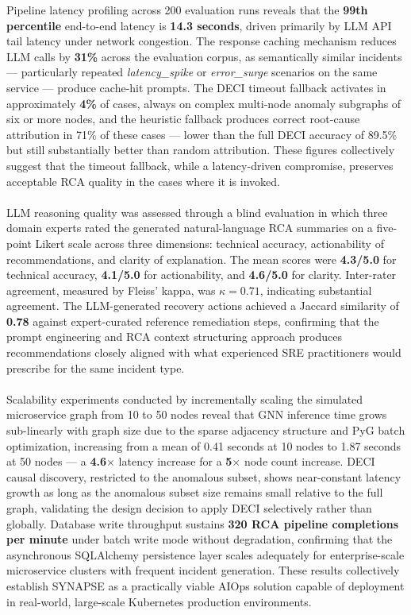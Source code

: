 \hspace*{0.3in} Pipeline latency profiling across 200 evaluation runs reveals that the \textbf{99th percentile} end-to-end latency is \textbf{14.3 seconds}, driven primarily by LLM API tail latency under network congestion. The response caching mechanism reduces LLM calls by \textbf{31\%} across the evaluation corpus, as semantically similar incidents — particularly repeated \textit{latency\_spike} or \textit{error\_surge} scenarios on the same service — produce cache-hit prompts. The DECI timeout fallback activates in approximately \textbf{4\%} of cases, always on complex multi-node anomaly subgraphs of six or more nodes, and the heuristic fallback produces correct root-cause attribution in 71\% of these cases — lower than the full DECI accuracy of 89.5\% but still substantially better than random attribution. These figures collectively suggest that the timeout fallback, while a latency-driven compromise, preserves acceptable RCA quality in the cases where it is invoked.\\\\

\hspace*{0.3in} LLM reasoning quality was assessed through a blind evaluation in which three domain experts rated the generated natural-language RCA summaries on a five-point Likert scale across three dimensions: technical accuracy, actionability of recommendations, and clarity of explanation. The mean scores were \textbf{4.3/5.0} for technical accuracy, \textbf{4.1/5.0} for actionability, and \textbf{4.6/5.0} for clarity. Inter-rater agreement, measured by Fleiss' kappa, was $\kappa = 0.71$, indicating substantial agreement. The LLM-generated recovery actions achieved a Jaccard similarity of \textbf{0.78} against expert-curated reference remediation steps, confirming that the prompt engineering and RCA context structuring approach produces recommendations closely aligned with what experienced SRE practitioners would prescribe for the same incident type.\\\\

\hspace*{0.3in} Scalability experiments conducted by incrementally scaling the simulated microservice graph from 10 to 50 nodes reveal that GNN inference time grows sub-linearly with graph size due to the sparse adjacency structure and PyG batch optimization, increasing from a mean of 0.41 seconds at 10 nodes to 1.87 seconds at 50 nodes — a \textbf{4.6$\times$} latency increase for a \textbf{5$\times$} node count increase. DECI causal discovery, restricted to the anomalous subset, shows near-constant latency growth as long as the anomalous subset size remains small relative to the full graph, validating the design decision to apply DECI selectively rather than globally. Database write throughput sustains \textbf{320 RCA pipeline completions per minute} under batch write mode without degradation, confirming that the asynchronous SQLAlchemy persistence layer scales adequately for enterprise-scale microservice clusters with frequent incident generation. These results collectively establish SYNAPSE as a practically viable AIOps solution capable of deployment in real-world, large-scale Kubernetes production environments.
